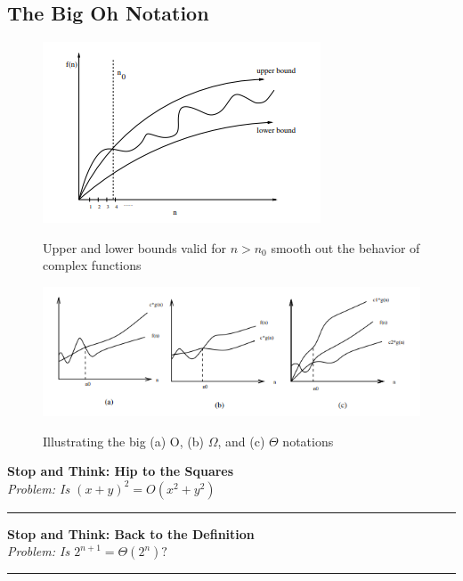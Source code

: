 \subsection{The Big Oh Notation}

\begin{figure}[H]
  \centering
     \includegraphics[scale=0.6]{./2_2.png}
  \label{fig:demo-diagram2-2}
  \caption{Upper and lower bounds valid for $n>n_{0}$ smooth out the behavior of complex
		   functions}
\end{figure}

\begin{figure}[H]
  \centering
     \includegraphics[scale=0.6]{./2_3.png}
  \label{fig:demo-diagram2-3}
  \caption{ Illustrating the big (a) O, (b) $\Omega$, and (c) $\Theta$ notations}
\end{figure}

\textbf{Stop and Think: Hip to the Squares} \\

\emph{Problem: Is $(x+y)^{2} = O(x^{2} + y^{2})$}

\noindent\rule{\textwidth}{0.4pt}

\textbf{Stop and Think: Back to the Definition} \\

\emph{Problem: Is $2^{n+1} = \Theta (2^{n}) ?$}

\noindent\rule{\textwidth}{0.4pt}